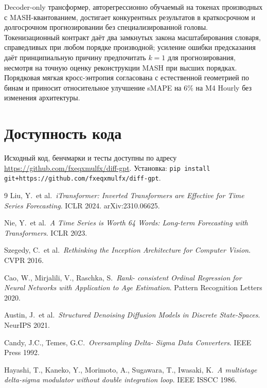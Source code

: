 \documentclass[11pt]{article}
\theoremstyle{remark}
\begin{document}
Decoder-only трансформер, авторегрессионно обучаемый на токенах
производных с MASH-квантованием, достигает конкурентных результатов в
краткосрочном и долгосрочном прогнозировании без специализированной
головы. Токенизационный контракт даёт два замкнутых закона
масштабирования словаря, справедливых при любом порядке производной;
усиление ошибки предсказания даёт принципиальную причину предпочитать
$k=1$ для прогнозирования, несмотря на точную оценку реконструкции
MASH при высших порядках. Порядковая мягкая кросс-энтропия согласована
с естественной геометрией по бинам и приносит относительное улучшение
sMAPE на $6\%$ на M4 Hourly без изменения архитектуры.

\section*{Доступность кода}

Исходный код, бенчмарки и тесты доступны по адресу
\url{https://github.com/fxeqxmulfx/diff-gpt}. Установка:
\texttt{pip install git+https://github.com/fxeqxmulfx/diff-gpt}.

\begin{thebibliography}{9}
 Liu, Y.\ et al.\ \emph{iTransformer: Inverted
Transformers are Effective for Time Series Forecasting}. ICLR 2024.
arXiv:2310.06625.

 Nie, Y.\ et al.\ \emph{A Time Series is Worth 64
Words: Long-term Forecasting with Transformers}. ICLR 2023.

 Szegedy, C.\ et al.\ \emph{Rethinking the
Inception Architecture for Computer Vision}. CVPR 2016.

 Cao, W., Mirjalili, V., Raschka, S.\ \emph{Rank-
consistent Ordinal Regression for Neural Networks with Application to
Age Estimation}. Pattern Recognition Letters 2020.

 Austin, J.\ et al.\ \emph{Structured Denoising
Diffusion Models in Discrete State-Spaces}. NeurIPS 2021.

 Candy, J.C., Temes, G.C.\ \emph{Oversampling Delta-
Sigma Data Converters}. IEEE Press 1992.

 Hayashi, T., Kaneko, Y., Morimoto, A.,
Sugawara, T., Iwasaki, K.\ \emph{A multistage delta-sigma modulator
without double integration loop}. IEEE ISSCC 1986.
\end{thebibliography}
\end{document}
